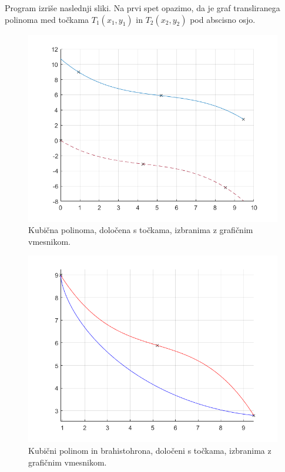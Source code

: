 \documentclass[a4paper]{article}
\begin{document}
Program izriše naslednji sliki. Na prvi spet opazimo, da je graf transliranega polinoma med točkama $T_1(x_1,y_1)$ in $T_2(x_2,y_2)$ pod abscisno osjo.
%
\begin{figure}[h!]
\begin{center}
\includegraphics[scale=0.52]{primer1-polinom.png}
\caption{Kubična polinoma, določena s točkama, izbranima z grafičnim vmesnikom.}
\end{center}
\end{figure}
%
\begin{figure}[h!]
\begin{center}
\includegraphics[scale=0.52]{primer1-PolBrah.png}
\caption{Kubični polinom in brahistohrona, določeni s točkama, izbranima z grafičnim vmesnikom.}
\end{center}
\end{figure}
\end{document}
